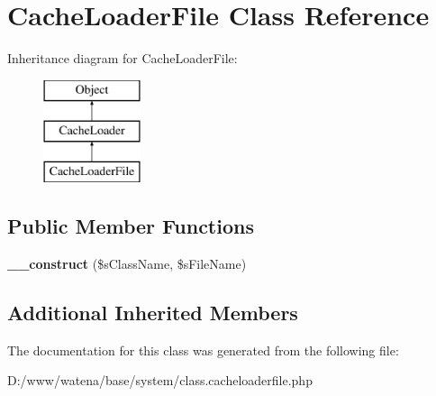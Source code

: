 \hypertarget{class_cache_loader_file}{\section{Cache\-Loader\-File Class Reference}
\label{class_cache_loader_file}
}
Inheritance diagram for Cache\-Loader\-File\-:\begin{figure}[H]
\begin{center}
\leavevmode
\includegraphics[height=3.000000cm]{class_cache_loader_file}
\end{center}
\end{figure}
\subsection*{Public Member Functions}
\begin{DoxyCompactItemize}
\item 
\hypertarget{class_cache_loader_file_a5d123207eed0dc2e705b73683d40441c}{{\bfseries \-\_\-\-\_\-construct} (\$s\-Class\-Name, \$s\-File\-Name)}\label{class_cache_loader_file_a5d123207eed0dc2e705b73683d40441c}

\end{DoxyCompactItemize}
\subsection*{Additional Inherited Members}


The documentation for this class was generated from the following file\-:\begin{DoxyCompactItemize}
\item 
D\-:/www/watena/base/system/class.\-cacheloaderfile.\-php\end{DoxyCompactItemize}
